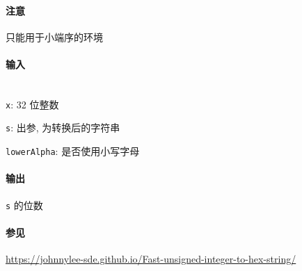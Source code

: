 \paragraph{注意}

只能用于小端序的环境

\paragraph{输入}~\\

\verb|x|: 32 位整数

\verb|s|: 出参, 为转换后的字符串

\verb|lowerAlpha|: 是否使用小写字母

\paragraph{输出}

\verb|s| 的位数

\paragraph{参见}

\url{https://johnnylee-sde.github.io/Fast-unsigned-integer-to-hex-string/}
